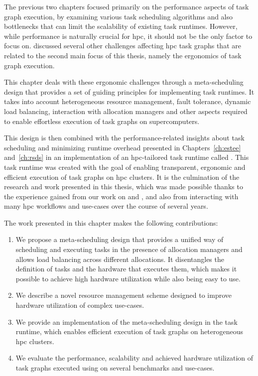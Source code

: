 The previous two chapters focused primarily on the performance aspects of task graph execution, by
examining various task scheduling algorithms and also bottlenecks that can limit the scalability of
existing task runtimes. However, while performance is naturally crucial for
\gls{hpc}, it should not be the only factor to focus on. 
discussed several other challenges affecting \gls{hpc} task graphs that are related
to the second main focus of this thesis, namely the ergonomics of task graph execution.

This chapter deals with these ergonomic challenges through a meta-scheduling design that provides a
set of guiding principles for implementing task runtimes. It takes into account heterogeneous
resource management, fault tolerance, dynamic load balancing, interaction with allocation managers
and other aspects required to enable effortless execution of task graphs on supercomputers.

This design is then combined with the performance-related insights about task scheduling and
minimizing runtime overhead presented in Chapters~\ref{ch:estee}
and~\ref{ch:rsds} in an implementation of an \gls{hpc}-tailored task
runtime called \hyperqueue{}. This task runtime was created with the goal of enabling
transparent, ergonomic and efficient execution of task graphs on \gls{hpc} clusters.
It is the culmination of the research and work presented in this thesis, which was made possible
thanks to the experience gained from our work on \estee{} and
\rsds{}, and also from interacting with many \gls{hpc} workflows and
use-cases over the course of several years.

The work presented in this chapter makes the following contributions:
\begin{enumerate}
	\item We propose a meta-scheduling design that provides a unified way of scheduling and executing tasks
	      in the presence of allocation managers and allows load balancing across different allocations. It
	      disentangles the definition of tasks and the hardware that executes them, which makes it possible
	      to achieve high hardware utilization while also being easy to use.
	\item We describe a novel resource management scheme designed to improve hardware utilization of complex
	      use-cases.
	\item We provide an implementation of the meta-scheduling design in the \hyperqueue{} task
	      runtime, which enables efficient execution of task graphs on heterogeneous \gls{hpc}
	      clusters.  %
	\item We evaluate the performance, scalability and achieved hardware utilization of task graphs executed
	      using \hyperqueue{} on several benchmarks and use-cases.
\end{enumerate}

